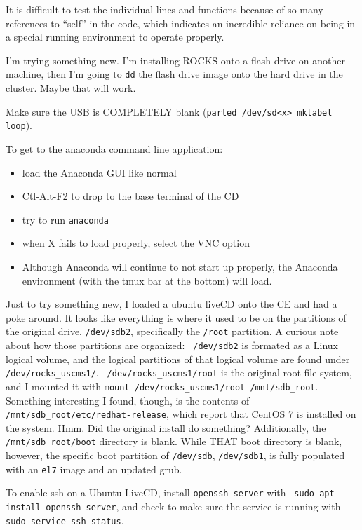 \documentclass[12pt]{article}
\begin{document}
It is difficult to test the individual lines and functions because of so many
references to ``self'' in the code, which indicates an incredible reliance on
being in a special running environment to operate properly.

\qq I'm trying something new. I'm installing ROCKS onto a flash drive on another
machine, then I'm going to {\tt dd} the flash drive image onto the hard drive in
the cluster. Maybe that will work.

\qq Make sure the USB is COMPLETELY blank ({\tt parted /dev/sd<x> mklabel loop}).

\qq To get to the anaconda command line application:
\begin{itemize}
  \item load the Anaconda GUI like normal
  \item Ctl-Alt-F2 to drop to the base terminal of the CD
  \item try to run {\tt anaconda}
  \item when X fails to load properly, select the VNC option
  \item Although Anaconda will continue to not start up properly, the Anaconda
    environment (with the tmux bar at the bottom) will load.
\end{itemize}

\qq Just to try something new, I loaded a ubuntu liveCD onto the CE and had a
poke around. It looks like everything is where it used to be on the partitions
of the original drive, {\tt /dev/sdb2}, specifically the {\tt /root}
partition. A curious note about how those partitions are organized: {\tt
  /dev/sdb2} is formated as a Linux logical volume, and the logical partitions
of that logical volume are found under {\tt /dev/rocks\_uscms1/}. {\tt
  /dev/rocks\_uscms1/root} is the original root file system, and I mounted it
with {\tt mount /dev/rocks\_uscms1/root /mnt/sdb\_root}. Something interesting I
found, though, is the contents of {\tt /mnt/sdb\_root/etc/redhat-release}, which
report that CentOS 7 is installed on the system. Hmm. Did the original install
do something? Additionally, the {\tt /mnt/sdb\_root/boot} directory is
blank. While THAT boot directory is blank, however, the specific boot partition
of {\tt /dev/sdb}, {\tt /dev/sdb1}, is fully populated with an {\tt el7} image
and an updated grub. 

\qq To enable ssh on a Ubuntu LiveCD, install {\tt openssh-server} with {\tt
  sudo apt install openssh-server}, and check to make sure the service is running
with {\tt sudo service ssh status}.
\end{document}
